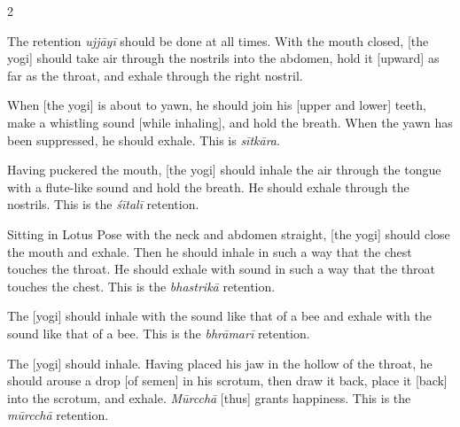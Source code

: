 \begin{nohyp}
\begin{multicols}{2}
\begin{eng}

The retention \textit{ujjāyī} should be done at all times. With the mouth closed, [the yogi] should take air through the nostrils into the abdomen, hold it [upward] as far as the throat, and exhale through the right nostril.
\vskip 7pt


When [the yogi] is about to yawn, he should join his [upper and lower] teeth, make a whistling sound [while inhaling], and hold the breath. When the yawn has been suppressed, he should exhale. This is \textit{sītkāra}.
\vskip 7pt


Having puckered the mouth, [the yogi] should inhale the air through the tongue with a flute-like sound and hold the breath. He should exhale through the nostrils. This is the \textit{śītalī} retention.
\vskip 7pt


Sitting in Lotus Pose with the neck and abdomen straight,  [the yogi] should close the mouth and exhale. Then he should inhale in such a way that the chest touches the throat. He should exhale with sound in such a way that the throat touches the chest. This is the \textit{bhastrikā} retention.
\vskip 7pt


The [yogi] should inhale with the sound like that of a bee and exhale with the sound like that of a bee. This is the  \textit{bhrāmarī} retention.
\columnbreak


The [yogi] should inhale. Having placed his jaw in the hollow of the throat, he should arouse a drop [of semen] in his scrotum, then draw it back, place it [back] into the scrotum, and exhale. \textit{Mūrcchā} [thus] grants happiness. This is the \textit{mūrcchā} retention.
\vskip 7pt


\end{eng}
\end{multicols}
\end{nohyp}
